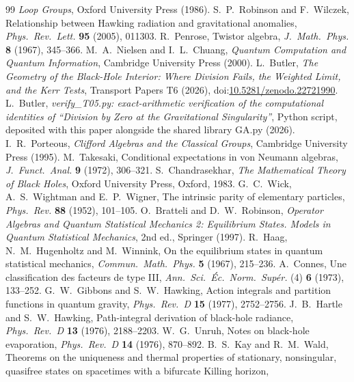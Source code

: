 \documentclass[11pt]{article}
\theoremstyle{definition}
\theoremstyle{plain}
\begin{document}
\begin{thebibliography}{99}
\emph{Loop Groups},
Oxford University Press (1986).
 S.~P.~Robinson and F.~Wilczek,
Relationship between Hawking radiation and gravitational anomalies,
\emph{Phys.\ Rev.\ Lett.} \textbf{95} (2005), 011303.
 R.~Penrose,
Twistor algebra,
\emph{J.\ Math.\ Phys.} \textbf{8} (1967), 345--366.
 M.~A.~Nielsen and I.~L.~Chuang,
\emph{Quantum Computation and Quantum Information},
Cambridge University Press (2000).
 L.~Butler,
\emph{The Geometry of the Black-Hole Interior: Where Division Fails, the Weighted Limit, and the Kerr Tests},
Transport Papers T6 (2026), doi:\href{https://doi.org/10.5281/zenodo.22721990}{10.5281/zenodo.22721990}.
 L.~Butler,
\emph{verify\_T05.py: exact-arithmetic verification of the computational identities of ``Division by Zero at the Gravitational Singularity''},
Python script, deposited with this paper alongside the shared library GA.py (2026).
 I.~R.~Porteous,
\emph{Clifford Algebras and the Classical Groups},
Cambridge University Press (1995).
 M.~Takesaki,
Conditional expectations in von Neumann algebras,
\emph{J.\ Funct.\ Anal.} \textbf{9} (1972), 306--321.
 S.~Chandrasekhar,
\emph{The Mathematical Theory of Black Holes},
Oxford University Press, Oxford, 1983.
 G.~C.~Wick, A.~S.~Wightman and E.~P.~Wigner,
The intrinsic parity of elementary particles,
\emph{Phys.\ Rev.} \textbf{88} (1952), 101--105.
 O.~Bratteli and D.~W.~Robinson,
\emph{Operator Algebras and Quantum Statistical Mechanics 2: Equilibrium States. Models in Quantum Statistical Mechanics},
2nd ed., Springer (1997).
 R.~Haag, N.~M.~Hugenholtz and M.~Winnink,
On the equilibrium states in quantum statistical mechanics,
\emph{Commun.\ Math.\ Phys.} \textbf{5} (1967), 215--236.
 A.~Connes,
Une classification des facteurs de type III,
\emph{Ann.\ Sci.\ \'Ec.\ Norm.\ Sup\'er.} (4) \textbf{6} (1973), 133--252.
 G.~W.~Gibbons and S.~W.~Hawking,
Action integrals and partition functions in quantum gravity,
\emph{Phys.\ Rev.\ D} \textbf{15} (1977), 2752--2756.
 J.~B.~Hartle and S.~W.~Hawking,
Path-integral derivation of black-hole radiance,
\emph{Phys.\ Rev.\ D} \textbf{13} (1976), 2188--2203.
 W.~G.~Unruh,
Notes on black-hole evaporation,
\emph{Phys.\ Rev.\ D} \textbf{14} (1976), 870--892.
 B.~S.~Kay and R.~M.~Wald,
Theorems on the uniqueness and thermal properties of stationary, nonsingular, quasifree states on spacetimes with a bifurcate Killing horizon,

\end{thebibliography}
\end{document}
